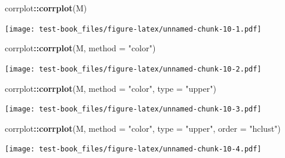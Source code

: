 \documentclass[]{book}
\newenvironment{Shaded}{\begin{snugshade}}{\end{snugshade}}
\newcommand{\DataTypeTok}[1]{\textcolor[rgb]{0.13,0.29,0.53}{#1}}
\newcommand{\KeywordTok}[1]{\textcolor[rgb]{0.13,0.29,0.53}{\textbf{#1}}}
\newcommand{\NormalTok}[1]{#1}
\newcommand{\OperatorTok}[1]{\textcolor[rgb]{0.81,0.36,0.00}{\textbf{#1}}}
\newcommand{\StringTok}[1]{\textcolor[rgb]{0.31,0.60,0.02}{#1}}
\begin{document}
\begin{Shaded}
\end{Shaded}

\begin{Shaded}
\begin{Highlighting}[]
\NormalTok{corrplot}\OperatorTok{::}\KeywordTok{corrplot}\NormalTok{(M)}
\end{Highlighting}
\end{Shaded}

\texttt{[image: test-book\_files/figure-latex/unnamed-chunk-10-1.pdf]}

\begin{Shaded}
\begin{Highlighting}[]
\NormalTok{corrplot}\OperatorTok{::}\KeywordTok{corrplot}\NormalTok{(M, }\DataTypeTok{method =} \StringTok{"color"}\NormalTok{)}
\end{Highlighting}
\end{Shaded}

\texttt{[image: test-book\_files/figure-latex/unnamed-chunk-10-2.pdf]}

\begin{Shaded}
\begin{Highlighting}[]
\NormalTok{corrplot}\OperatorTok{::}\KeywordTok{corrplot}\NormalTok{(M, }\DataTypeTok{method =} \StringTok{"color"}\NormalTok{, }\DataTypeTok{type =} \StringTok{"upper"}\NormalTok{)}
\end{Highlighting}
\end{Shaded}

\texttt{[image: test-book\_files/figure-latex/unnamed-chunk-10-3.pdf]}

\begin{Shaded}
\begin{Highlighting}[]
\NormalTok{corrplot}\OperatorTok{::}\KeywordTok{corrplot}\NormalTok{(M, }\DataTypeTok{method =} \StringTok{"color"}\NormalTok{, }\DataTypeTok{type =} \StringTok{"upper"}\NormalTok{, }\DataTypeTok{order =} \StringTok{"hclust"}\NormalTok{)}
\end{Highlighting}
\end{Shaded}

\texttt{[image: test-book\_files/figure-latex/unnamed-chunk-10-4.pdf]}
\end{document}
